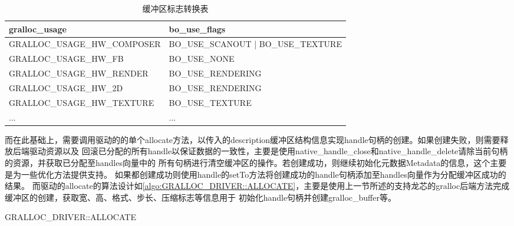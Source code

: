 \begin{table}[h]
  \centering
  \caption{缓冲区标志转换表}
  \label{tab:缓冲区标志转换表}
  \begin{tabular}{ll}
    \toprule
    gralloc\_usage & bo\_use\_flags \\
    \midrule
    GRALLOC\_USAGE\_HW\_COMPOSER & BO\_USE\_SCANOUT | BO\_USE\_TEXTURE \\
    GRALLOC\_USAGE\_HW\_FB & BO\_USE\_NONE \\
    GRALLOC\_USAGE\_HW\_RENDER & BO\_USE\_RENDERING \\
    GRALLOC\_USAGE\_HW\_2D & BO\_USE\_RENDERING \\
    GRALLOC\_USAGE\_HW\_TEXTURE & BO\_USE\_TEXTURE \\
    ... & ...\\ 
    \bottomrule
  \end{tabular}
  \note{}
\end{table}

而在此基础上，需要调用驱动的的单个allocate方法，以传入的description缓冲区结构信息实现handle句柄的创建。如果创建失败，则需要释放后端驱动资源以及
回滚已分配的所有handle以保证数据的一致性，主要是使用native\_handle\_close和native\_handle\_delete请除当前句柄的资源，并获取已分配至handles向量中的
所有句柄进行清空缓冲区的操作。若创建成功，则继续初始化元数据Metadata的信息，这个主要是为一些优化方法提供支持。
如果都创建成功则使用handle的setTo方法将创建成功的handle句柄添加至handles向量作为分配缓冲区成功的结果。
而驱动的allocate的算法设计如\ref{algo:GRALLOC_DRIVER::ALLOCATE}，主要是使用上一节所述的支持龙芯的gralloc后端方法完成缓冲区的创建，获取宽、高、格式、步长、压缩标志等信息用于
初始化handle句柄并创建gralloc\_buffer等。

\begin{algorithm}
  \caption{GRALLOC\_DRIVER::ALLOCATE}
  \label{algo:GRALLOC_DRIVER::ALLOCATE}
  \SetAlgoLined
  \end{algorithm}

